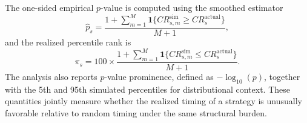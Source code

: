 \documentclass[risks,article,submit,pdftex,oneauthor]{Definitions/mdpi}
\begin{document}
The one-sided empirical \(p\)-value is computed using the smoothed estimator
\begin{equation}
\hat{p}_s
=
\frac{1+\sum_{m=1}^{M}\mathbf{1}\{CR_{s,m}^{\mathrm{sim}}\ge CR_s^{\mathrm{actual}}\}}{M+1},
\end{equation}
and the realized percentile rank is
\begin{equation}
\pi_s
=
100\times
\frac{1+\sum_{m=1}^{M}\mathbf{1}\{CR_{s,m}^{\mathrm{sim}}\le CR_s^{\mathrm{actual}}\}}{M+1}.
\end{equation}
The analysis also reports \(p\)-value prominence, defined as \(-\log_{10}(p)\), together with the 5th and 95th simulated percentiles for distributional context. These quantities jointly measure whether the realized timing of a strategy is unusually favorable relative to random timing under the same structural burden.
\end{document}
